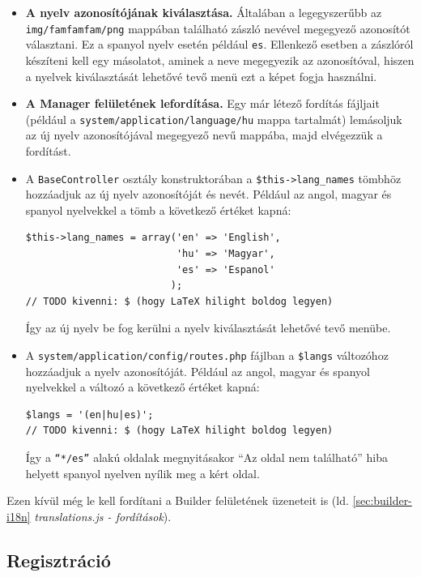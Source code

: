 \documentclass[12pt,a4paper,twoside]{article}
\begin{document}
\begin{itemize}
  \item \textbf{A nyelv azonosítójának kiválasztása.} Általában a legegyszerűbb az
    \texttt{img/famfamfam/png} mappában található zászló nevével megegyező
    azonosítót választani. Ez a spanyol nyelv esetén például
    \texttt{es}. Ellenkező esetben a zászlóról készíteni kell egy
    másolatot, aminek a neve megegyezik az azonosítóval, hiszen a nyelvek
    kiválasztását lehetővé tevő menü ezt a képet fogja használni.
  \item \textbf{A Manager felületének lefordítása.} Egy már létező fordítás fájljait
    (például a \texttt{system/application/language/hu} mappa tartalmát)
    lemásoljuk az új nyelv azonosítójával megegyező nevű mappába, majd
    elvégezzük a fordítást.
  \item A \texttt{BaseController} osztály konstruktorában a
    \texttt{\$this->lang\_names} tömbhöz hozzáadjuk az új nyelv azonosítóját és
    nevét. Például az angol, magyar és spanyol nyelvekkel a tömb a következő
    értéket kapná:
    \begin{lstlisting}[firstnumber=35]
$this->lang_names = array('en' => 'English',
                          'hu' => 'Magyar',
                          'es' => 'Espanol'
                         );
// TODO kivenni: $ (hogy LaTeX hilight boldog legyen)
    \end{lstlisting}
    Így az új nyelv be fog kerülni a nyelv kiválasztását lehetővé tevő menübe.
  \item A \texttt{system/application/config/routes.php} fájlban a
    \texttt{\$langs} változóhoz hozzáadjuk a nyelv azonosítóját. Például az
    angol, magyar és spanyol nyelvekkel a változó a következő értéket kapná:
    \begin{lstlisting}[firstnumber=46]
$langs = '(en|hu|es)';
// TODO kivenni: $ (hogy LaTeX hilight boldog legyen)
    \end{lstlisting}
    Így a \texttt{``*/es''} alakú oldalak megnyitásakor ``Az oldal nem található''
    hiba helyett spanyol nyelven nyílik meg a kért oldal.

\end{itemize}

Ezen kívül még le kell fordítani a Builder felületének üzeneteit is (ld.
\ref{sec:builder-i18n} \textit{translations.js - fordítások}).

\subsection{Regisztráció}
\label{sec:reg_check}
\end{document}
